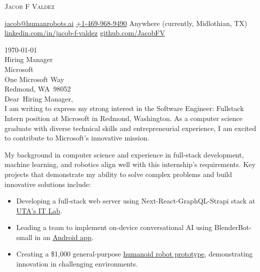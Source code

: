 \documentclass[12pt]{letter}
\makeatletter
\newcommand{\myname}{Jacob F Valdez}
\newcommand{\myemail}{jacob@humanrobots.ai}
\newcommand{\myphone}{+1-469-968-9490}
\newcommand{\mylocation}{Anywhere (currently, Midlothian, TX)}
\newcommand{\mylinkedin}{jacob-f-valdez}
\newcommand{\recipient}{Hiring Manager}
\newcommand{\company}{Microsoft}
\newcommand{\street}{One Microsoft Way}
\newcommand{\city}{Redmond}
\newcommand{\state}{WA}
\newcommand{\zip}{98052}
\newcommand{\greeting}{Dear}
\makeatother
\begin{document}

\begin{center}
    {\fontsize{28}{0}\selectfont\scshape \myname}

    {\fontsize{10.5}{0}\selectfont\href{mailto:\myemail}{\faEnvelope\enspace \myemail} \quad \href{tel:\myphone}{\faPhone\enspace \myphone} \quad \faMapMarker\enspace \mylocation}
    \vspace{-0.1in}
    {\fontsize{10.5}{0}\selectfont\href{https://linkedin.com/in/\mylinkedin}{\faLinkedinIn\enspace linkedin.com/in/\mylinkedin} \quad \href{https://github.com/JacobFV}{\faGithub\enspace github.com/JacobFV}}
\end{center}

\vspace{0.2in}

\today\\

\vspace{-0.1in}\recipient\\
\company\\
\street\\
\city, \state\ \zip\\

\vspace{-0.1in}\greeting\ \recipient,\\

\vspace{-0.1in}\setlength\parindent{24pt}
\noindent I am writing to express my strong interest in the Software Engineer: Fullstack Intern position at Microsoft in Redmond, Washington. As a computer science graduate with diverse technical skills and entrepreneurial experience, I am excited to contribute to Microsoft's innovative mission.

My background in computer science and experience in full-stack development, machine learning, and robotics align well with this internship's requirements. Key projects that demonstrate my ability to solve complex problems and build innovative solutions include:

\begin{itemize}
    \item Developing a full-stack web server using Next-React-GraphQL-Strapi stack at \href{https://itlab.uta.edu}{UTA's IT Lab}.
    \item Leading a team to implement on-device conversational AI using BlenderBot-small in an \href{https://github.com/kmosoti/DesparadosAEYE}{Android app}.
    \item Creating a \$1,000 general-purpose \href{https://www.youtube.com/playlist?list=PLMkgx9jjZQwejmpqk0tBEY1AXa9s30bE4}{humanoid robot prototype}, demonstrating innovation in challenging environments.
\end{itemize}
\end{document}
